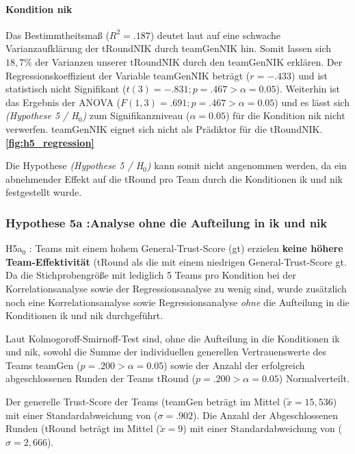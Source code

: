 \documentclass[a4paper,11pt]{article}%
\renewcommand{\\}{\vspace*{0.5\baselineskip} \newline}
\begin{document}
\paragraph{Kondition \ac{nik}}
Das Bestimmtheitsmaß ($R^{2} = .187$) deutet laut \citep{cohen2013statistical} auf eine schwache Varianzaufklärung der \ac{tRoundNIK} durch \ac{teamGenNIK} hin. Somit lassen sich $18,7\%$ der Varianzen unserer \ac{tRoundNIK} durch den \ac{teamGenNIK} erklären. \\
Der Regressionskoeffizient der Variable \ac{teamGenNIK} beträgt ($r = -.433$) und ist statistisch nicht Signifikant ($t(3) = -.831; p = .467 > \alpha = 0.05$). \\
Weiterhin ist das Ergebnis der ANOVA ($F(1,3) = .691; p = .467 > \alpha = 0.05$) und es lässt sich \textit{(Hypothese 5 / H$_{0}$)} zum Signifikanzniveau ($\alpha = 0.05$) für die Kondition \ac{nik} nicht verwerfen. \\
\ac{teamGenNIK} eignet sich nicht als Prädiktor für die \ac{tRoundNIK}.\\
\textbf{\autoref{fig:h5_regression}}

Die Hypothese \textit{(Hypothese 5 / H$_{0}$)} kann somit nicht angenommen werden, da ein abnehmender Effekt auf die \ac{tRound} pro Team durch die Konditionen \ac{ik} und \ac{nik} festgestellt wurde.

\subsubsection{Hypothese 5a :Analyse ohne die Aufteilung in \ac{ik} und \ac{nik}}
H5a$_{0}$ : Teams mit einem hohem General-Trust-Score (\ac{gt}) erzielen \textbf{keine höhere Team-Effektivität} (\ac{tRound} als die mit einem niedrigen General-Trust-Score \ac{gt}.\\
Da die Stichprobengröße mit lediglich 5 Teams pro Kondition bei der Korrelationsanalyse sowie der Regressionsanalyse zu wenig sind, wurde zusätzlich noch eine Korrelationsanalyse sowie Regressionsanalyse \textit{ohne} die Aufteilung in die Konditionen \ac{ik} und \ac{nik} durchgeführt.

Laut Kolmogoroff-Smirnoff-Test sind, ohne die Aufteilung in die Konditionen \ac{ik} und \ac{nik}, sowohl die Summe der individuellen generellen Vertrauenswerte des Teams \ac{teamGen} ($p = .200 > \alpha = 0.05$) sowie der Anzahl der erfolgreich abgeschlossenen Runden der Teams \ac{tRound} ($p = .200 > \alpha = 0.05$) Normalverteilt.

Der generelle Trust-Score der Teams (\ac{teamGen} beträgt im Mittel ($\tilde x = 15,536$) mit einer Standardabweichung von ($\sigma = .902$).
Die Anzahl der Abgeschlossenen Runden (\ac{tRound} beträgt im Mittel ($\tilde x = 9$) mit einer Standardabweichung von ($\sigma = 2,666$). 
\end{document}
